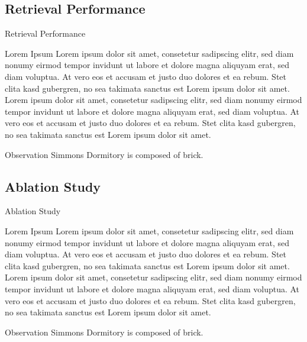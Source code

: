 \documentclass{beamer}
\begin{document}
\subsection{Retrieval Performance}
\begin{frame}{Retrieval Performance}
	\begin{block}{Lorem Ipsum}
		Lorem ipsum dolor sit amet, consetetur sadipscing elitr, sed diam nonumy eirmod tempor invidunt ut labore et dolore magna aliquyam erat, sed diam voluptua. 
		At vero eos et accusam et justo duo dolores et ea rebum. Stet clita kasd gubergren, no sea takimata sanctus est Lorem ipsum dolor sit amet. 
		Lorem ipsum dolor sit amet, consetetur sadipscing elitr, sed diam nonumy eirmod tempor invidunt ut labore et dolore magna aliquyam erat, sed diam voluptua. 
		At vero eos et accusam et justo duo dolores et ea rebum. Stet clita kasd gubergren, no sea takimata sanctus est Lorem ipsum dolor sit amet.
	\end{block}
	\begin{block}{Observation}
		Simmons Dormitory is composed of brick.
	\end{block} 
\end{frame}

\subsection{Ablation Study}
\begin{frame}{Ablation Study}
	\begin{block}{Lorem Ipsum}
		Lorem ipsum dolor sit amet, consetetur sadipscing elitr, sed diam nonumy eirmod tempor invidunt ut labore et dolore magna aliquyam erat, sed diam voluptua. 
		At vero eos et accusam et justo duo dolores et ea rebum. Stet clita kasd gubergren, no sea takimata sanctus est Lorem ipsum dolor sit amet. 
		Lorem ipsum dolor sit amet, consetetur sadipscing elitr, sed diam nonumy eirmod tempor invidunt ut labore et dolore magna aliquyam erat, sed diam voluptua. 
		At vero eos et accusam et justo duo dolores et ea rebum. Stet clita kasd gubergren, no sea takimata sanctus est Lorem ipsum dolor sit amet.
	\end{block}
	\begin{block}{Observation}
		Simmons Dormitory is composed of brick.
	\end{block} 
\end{frame}
\end{document}
